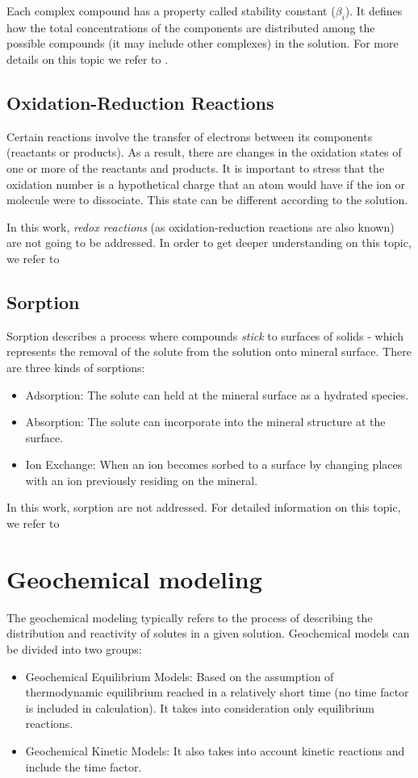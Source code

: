 Each complex compound has a property called stability constant ($\beta_i$). It defines how the total concentrations of the components are distributed among the possible compounds (it may include other complexes) in the solution. For more details on this topic we refer to \cite{Kehew:00}.

\subsection{Oxidation-Reduction Reactions}
Certain reactions involve the transfer of electrons between its components (reactants or products). As a result, there are changes in the oxidation states of one or more of the reactants and products. It is important to stress that the oxidation number is a hypothetical charge that an atom would have if the ion or molecule were to dissociate. This state can be different according to the solution. 

In this work, \emph{redox reactions} (as oxidation-reduction reactions are also known) are not going to be addressed. In order to get deeper understanding on this topic, we refer to \cite{Petrucci:07}


\subsection{Sorption}
Sorption describes a process where compounds \emph{stick} to surfaces of solids - which represents the removal of the solute from the solution onto mineral surface. There are three kinds of sorptions: 
\begin{itemize}
\item Adsorption: The solute can held at the mineral surface as a hydrated species.
\item Absorption: The solute can incorporate into the mineral structure at the surface.
\item Ion Exchange: When an ion becomes sorbed to a surface by changing places with an ion previously residing on the mineral.
\end{itemize}

In this work, sorption are not addressed. For detailed information on this topic, we refer to \cite{Freeze:79}

\section{Geochemical modeling}
The geochemical modeling typically refers to the process of describing the distribution and reactivity of solutes in a given solution. Geochemical models can be divided into two groups:
\begin{itemize}
\item Geochemical Equilibrium Models: Based on the assumption of thermodynamic equilibrium reached in a relatively short time (no time factor is included in calculation). It takes into consideration only equilibrium reactions.
\item Geochemical Kinetic Models: It also takes into account kinetic reactions and include the time factor. 
\end{itemize}

